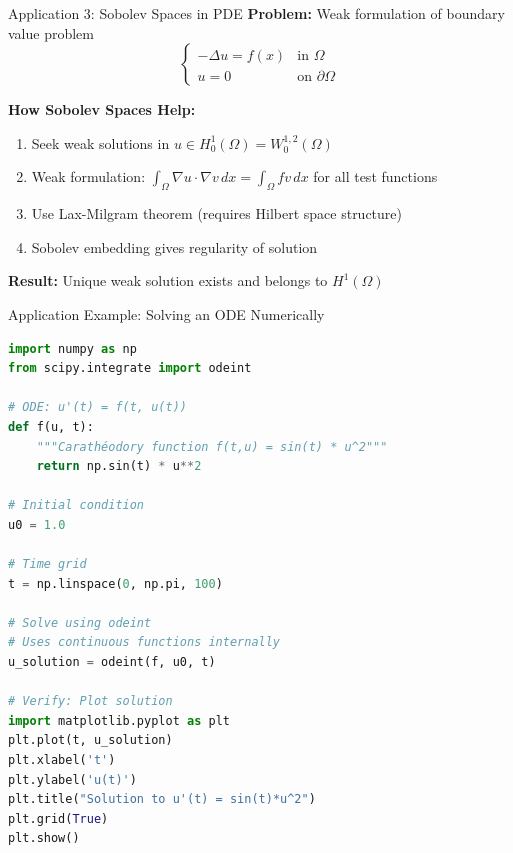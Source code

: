 \documentclass[aspectratio=169,10pt]{beamer}
\begin{document}
\begin{frame}{Application 3: Sobolev Spaces in PDE}
    \textbf{Problem:} Weak formulation of boundary value problem
    \[
        \begin{cases}
            -\Delta u = f(x) & \text{in } \Omega \\
            u = 0 & \text{on } \partial\Omega
        \end{cases}
    \]

    \vspace{0.3cm}
    \textbf{How Sobolev Spaces Help:}
    \begin{enumerate}
        \item Seek weak solutions in $u \in H_0^1(\Omega) = W_0^{1,2}(\Omega)$
        \item Weak formulation: $\int_\Omega \nabla u \cdot \nabla v \, dx = \int_\Omega f v \, dx$ for all test functions
        \item Use Lax-Milgram theorem (requires Hilbert space structure)
        \item Sobolev embedding gives regularity of solution
    \end{enumerate}

    \vspace{0.3cm}
    \textbf{Result:} Unique weak solution exists and belongs to $H^1(\Omega)$
\end{frame}

\begin{frame}[fragile]{Application Example: Solving an ODE Numerically}
    \begin{lstlisting}[language=Python]
import numpy as np
from scipy.integrate import odeint

# ODE: u'(t) = f(t, u(t))
def f(u, t):
    """Carathéodory function f(t,u) = sin(t) * u^2"""
    return np.sin(t) * u**2

# Initial condition
u0 = 1.0

# Time grid
t = np.linspace(0, np.pi, 100)

# Solve using odeint
# Uses continuous functions internally
u_solution = odeint(f, u0, t)

# Verify: Plot solution
import matplotlib.pyplot as plt
plt.plot(t, u_solution)
plt.xlabel('t')
plt.ylabel('u(t)')
plt.title("Solution to u'(t) = sin(t)*u^2")
plt.grid(True)
plt.show()
    \end{lstlisting}
\end{frame}

\end{document}

